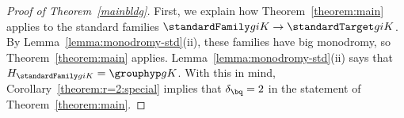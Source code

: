 \begin{proof}[Proof of Theorem~\ref{mainbldg}]
	First, we explain how Theorem~\ref{theorem:main} applies to the standard families $\standardFamily g i K \rightarrow \standardTarget g i K$. By Lemma~\ref{lemma:monodromy-std}(ii), these families have big monodromy, so Theorem~\ref{theorem:main} applies.  Lemma~\ref{lemma:monodromy-std}(ii) says that $H_{\standardFamily g i K} = \grouphyp g K$. With this in mind, Corollary~\ref{theorem:r=2:special} implies that $\delta_\bq = 2$ in the statement of Theorem~\ref{theorem:main}. 



\end{proof}
